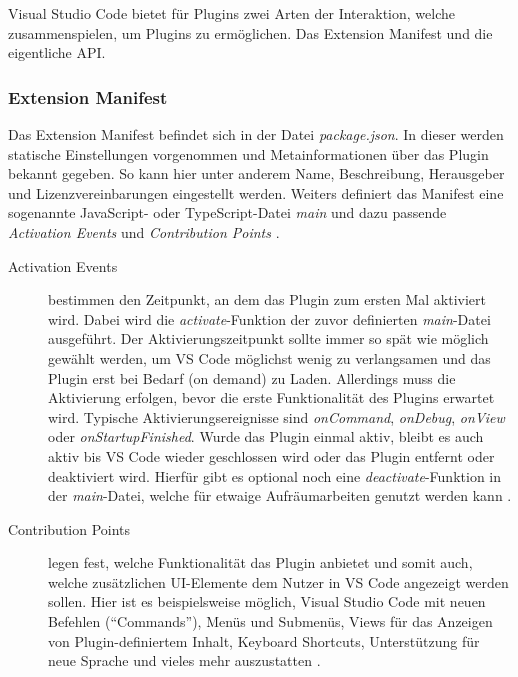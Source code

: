 Visual Studio Code bietet für Plugins zwei Arten der
Interaktion, welche zusammenspielen, um Plugins zu ermöglichen. 
Das Extension Manifest und die eigentliche API.
\subsubsection{Extension Manifest} 
  Das Extension Manifest befindet sich in der Datei \emph{package.json}.
  In dieser werden statische Einstellungen vorgenommen und
  Metainformationen über das Plugin bekannt gegeben. So kann hier unter
  anderem Name, Beschreibung, Herausgeber und Lizenzvereinbarungen
  eingestellt werden. Weiters definiert das Manifest eine sogenannte
  JavaScript- oder TypeScript-Datei \emph{main}  und dazu passende
  \emph{Activation Events} und \emph{Contribution Points}
  \cite{VSCodeExtensionAPIExtensionManifest,VSCodeExtensionAPIExtensionAnatomy}.
  \begin{description}
    \item[Activation Events] bestimmen den Zeitpunkt, an dem das Plugin zum ersten Mal
      aktiviert wird. Dabei wird die \emph{activate}-Funktion der zuvor definierten
      \emph{main}-Datei ausgeführt. Der Aktivierungszeitpunkt sollte immer so spät wie
      möglich gewählt werden, um VS Code möglichst wenig zu verlangsamen und
      das Plugin erst bei Bedarf (on demand) zu Laden. Allerdings
      muss die Aktivierung erfolgen, bevor die erste Funktionalität des
      Plugins erwartet wird. Typische Aktivierungsereignisse sind \emph{onCommand}, 
      \emph{onDebug}, \emph{onView} oder \emph{onStartupFinished}.
      Wurde das Plugin einmal aktiv, bleibt es auch aktiv bis VS Code wieder geschlossen
      wird oder das Plugin entfernt oder deaktiviert wird. Hierfür gibt es optional
      noch eine \emph{deactivate}-Funktion in der \emph{main}-Datei, welche für etwaige
      Aufräumarbeiten genutzt werden kann
      \cite{VSCodeExtensionAPIActivationEvents,VSCodeExtensionAPIExtensionAnatomy}.
    \item[Contribution Points] legen fest, welche Funktionalität das Plugin anbietet
      und somit auch, welche zusätzlichen UI-Elemente
      dem Nutzer in VS Code angezeigt werden sollen.
      Hier ist es beispielsweise möglich, Visual Studio Code mit neuen Befehlen (\enquote{Commands}),
      Menüs und Submenüs, Views für das Anzeigen von Plugin-definiertem Inhalt,
      Keyboard Shortcuts, Unterstützung für neue Sprache und vieles mehr auszustatten 
      \cite{VSCodeExtensionAPIContributionPoints}.
  \end{description}
